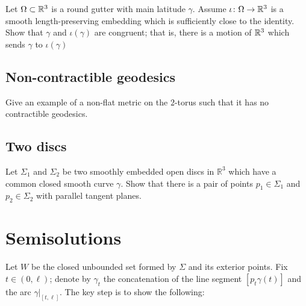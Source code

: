 \begin{pr}
Let $\Omega\subset \mathbb{R}^3$ is a round gutter with main latitude $\gamma$. 
Assume $\iota\:\Omega\z\to\RR^3$ 
is a smooth length-preserving embedding which is sufficiently close to the identity.
Show that $\gamma$ and $\iota(\gamma)$ are congruent;
that is, there is a motion of $\mathbb{R}^3$ which sends $\gamma$ to $\iota(\gamma)$
\end{pr}



\subsection*{Non-contractible geodesics}
\label{torus}

\begin{pr}
Give an example of a non-flat metric 
on the $2$-torus such that it has no contractible geodesics.
\end{pr}


\subsection*{Two discs}
\label{Two discs}

\begin{pr}
Let $\Sigma_1$ and $\Sigma_2$ be two smoothly embedded open discs in $\mathbb R^3$ 
which have a common closed smooth curve $\gamma$.
Show that there is a pair of points  $p_1\in \Sigma_1$ and $p_2\in \Sigma_2$ with parallel tangent planes.
\end{pr}



\section*{Semisolutions}
Let $W$ be the closed unbounded set formed by $\Sigma$ and its exterior points.
Fix $t\in (0,\ell)$;
denote by $\gamma_t$ the concatenation of the line segment $[p_t\gamma(t)]$ and the arc $\gamma|_{[t,\ell]}$.
The key step is to show the following:

